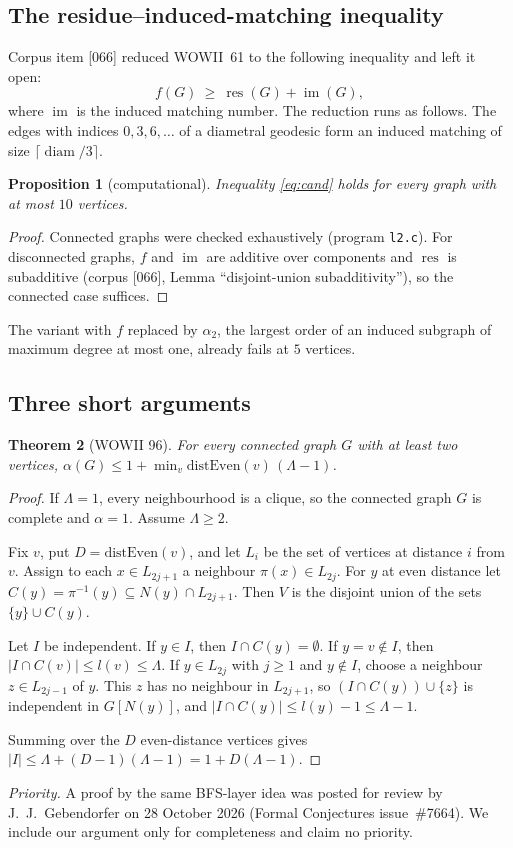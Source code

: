 \documentclass[11pt,a4paper]{article}
\newtheorem{theorem}{Theorem}[section]
\newtheorem{proposition}[theorem]{Proposition}
\theoremstyle{definition}
\newcommand{\res}{\operatorname{res}}
\newcommand{\im}{\operatorname{im}}
\newcommand{\diam}{\operatorname{diam}}
\begin{document}
\subsection{The residue--induced-matching inequality}
Corpus item [066] reduced WOWII~61 to the following inequality and left it open:
\begin{equation}\label{eq:cand}
f(G)\ \ge\ \res(G)+\im(G),
\end{equation}
where $\im$ is the induced matching number. The reduction runs as follows. The edges with
indices $0,3,6,\dots$ of a diametral geodesic form an induced matching of size
$\lceil\diam/3\rceil$.

\begin{proposition}[computational]
Inequality \eqref{eq:cand} holds for every graph with at most $10$ vertices.
\end{proposition}
\begin{proof}
Connected graphs were checked exhaustively (program \texttt{l2.c}). For disconnected graphs,
$f$ and $\im$ are additive over components and $\res$ is subadditive (corpus [066],
Lemma ``disjoint-union subadditivity''), so the connected case suffices.
\end{proof}

The variant with $f$ replaced by $\alpha_2$, the largest order of an induced subgraph of
maximum degree at most one, already fails at $5$ vertices.

\subsection{Three short arguments}

\begin{theorem}[WOWII 96]\label{thm:96}
For every connected graph $G$ with at least two vertices,
$\alpha(G)\le1+\min_v\mathrm{distEven}(v)\,(\Lambda-1)$.
\end{theorem}
\begin{proof}
If $\Lambda=1$, every neighbourhood is a clique, so the connected graph $G$ is complete and
$\alpha=1$. Assume $\Lambda\ge2$.

Fix $v$, put $D=\mathrm{distEven}(v)$, and let $L_i$ be the set of vertices at distance $i$
from $v$. Assign to each $x\in L_{2j+1}$ a neighbour $\pi(x)\in L_{2j}$. For $y$ at even
distance let $C(y)=\pi^{-1}(y)\subseteq N(y)\cap L_{2j+1}$. Then $V$ is the disjoint union
of the sets $\{y\}\cup C(y)$.

Let $I$ be independent. If $y\in I$, then $I\cap C(y)=\emptyset$. If $y=v\notin I$, then
$|I\cap C(v)|\le l(v)\le\Lambda$. If $y\in L_{2j}$ with $j\ge1$ and $y\notin I$, choose a
neighbour $z\in L_{2j-1}$ of $y$. This $z$ has no neighbour in $L_{2j+1}$, so
$(I\cap C(y))\cup\{z\}$ is independent in $G[N(y)]$, and $|I\cap C(y)|\le l(y)-1\le\Lambda-1$.

Summing over the $D$ even-distance vertices gives
$|I|\le\Lambda+(D-1)(\Lambda-1)=1+D(\Lambda-1)$.
\end{proof}
\noindent\emph{Priority.} A proof by the same BFS-layer idea was posted for review by
J.~J.~Gebendorfer on 28 October 2026 (Formal Conjectures issue~\#7664). We include our
argument only for completeness and claim no priority.
\end{document}
